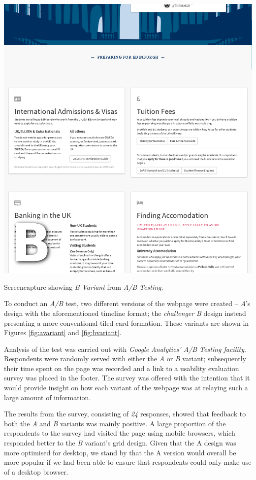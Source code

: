 \documentclass[a4paper, notoc]{tufte-handout}
\begin{document}
\begin{marginfigure}
  \includegraphics[width=\linewidth]{bvariant.png}
  \caption{
    \label{fig:bvariant}
    Screencapture showing \textit{B Variant} from \textit{A/B Testing}.
  }

\end{marginfigure}

To conduct an \textit{A/B} test, two different versions of the webpage were created -- 
\textit{A}'s design with the aforementioned timeline format; the \textit{challenger} 
\textit{B} design instead presenting a more conventional tiled card formation. These variants 
are shown in Figures \ref{fig:avariant} and \ref{fig:bvariant}.

Analysis of the test was carried out with \textit{Google Analytics' A/B Testing facility}. 
Respondents were randomly served with either the \textit{A} or \textit{B} variant; subsequently 
their time spent on the page was recorded and a link to a usability evaluation survey was
placed in the footer. The survey was offered with the intention that it would provide insight on how 
each variant of the webpage was at relaying such a large amount of information.

The results from the survey, consisting of \emph{24} responses, showed that feedback to both
the \textit{A} and \textit{B} variants was mainly positive. A large proportion of the respondents to the
survey had visited the page using mobile browsers, which responded better to the \textit{B} variant's grid design.
Given that the A design was more optimised for desktop, we stand by that the A version would overall be more popular if we had been able to ensure that respondents could only make
use of a desktop browser.
\end{document}
